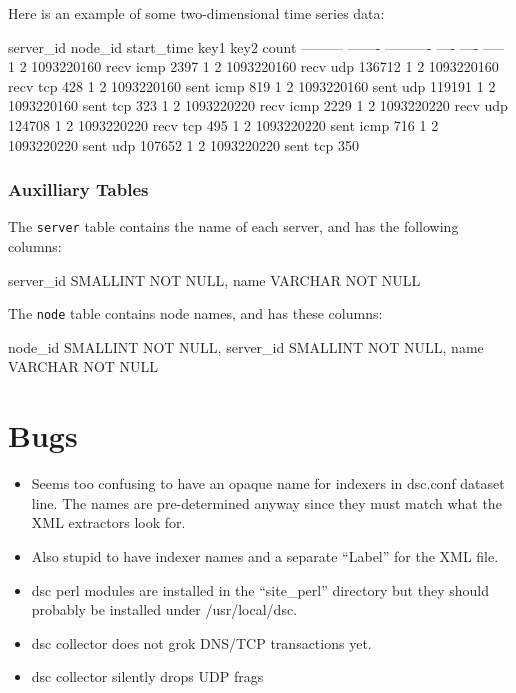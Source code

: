 \documentclass{report}
\def\dsc{{\sc dsc}}
\begin{document}
Here is an example of some two-dimensional time series data:
\begin{MyVerbatim}
server_id   node_id   start_time  key1  key2   count
---------   -------   ----------  ----  ----   -----
        1         2   1093220160  recv  icmp    2397
        1         2   1093220160  recv  udp   136712
        1         2   1093220160  recv  tcp      428
        1         2   1093220160  sent  icmp     819
        1         2   1093220160  sent  udp   119191
        1         2   1093220160  sent  tcp      323
        1         2   1093220220  recv  icmp    2229
        1         2   1093220220  recv  udp   124708
        1         2   1093220220  recv  tcp      495
        1         2   1093220220  sent  icmp     716
        1         2   1093220220  sent  udp   107652
        1         2   1093220220  sent  tcp      350
\end{MyVerbatim}

\subsection{Auxilliary Tables}

The {\tt server} table contains the name of each server, and
has the following columns:
\begin{MyVerbatim}
        server_id   SMALLINT NOT NULL,
        name        VARCHAR NOT NULL
\end{MyVerbatim}

The {\tt node} table contains node names, and has these columns:
\begin{MyVerbatim}
        node_id     SMALLINT NOT NULL,
        server_id   SMALLINT NOT NULL,
        name        VARCHAR NOT NULL
\end{MyVerbatim}

\chapter{Bugs}

\begin{itemize}

\item
	Seems too confusing to have an opaque name for indexers in
	dsc.conf dataset line.  The names are pre-determined anyway
	since they must match what the XML extractors look for.
\item
	Also stupid to have indexer names and a separate ``Label'' for
	the XML file.

\item
	{\dsc} perl modules are installed in the ``site\_perl'' directory
	but they should probably be installed under /usr/local/dsc.

\item
	{\dsc} collector does not grok DNS/TCP transactions yet.

\item
	{\dsc} collector silently drops UDP frags

\end{itemize}
\end{document}
